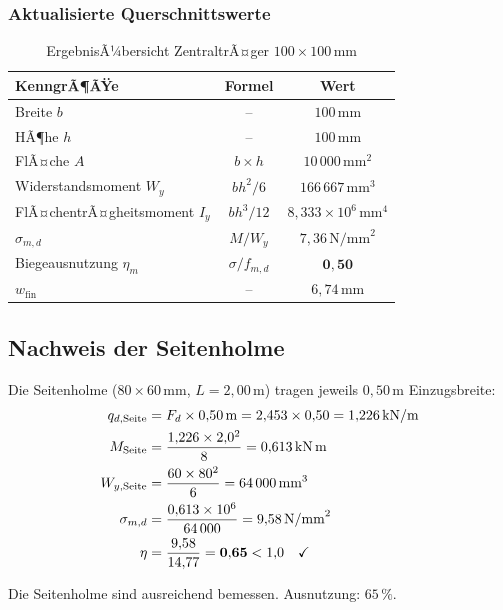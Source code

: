 ﻿\documentclass[12pt,a4paper]{article}
\theoremstyle{definition}
\theoremstyle{plain}
\theoremstyle{remark}
\begin{document}
\subsubsection{Aktualisierte Querschnittswerte}

\begin{table}[H]
\centering
\begin{tabular}{lcc}
\toprule
KenngrÃ¶ÃŸe & Formel & Wert \\
\midrule
Breite $b$ & -- & $100\,\text{mm}$ \\
HÃ¶he $h$   & -- & $100\,\text{mm}$ \\
FlÃ¤che $A$ & $b \times h$ & $10\,000\,\text{mm}^2$ \\
Widerstandsmoment $W_y$ & $b h^2 / 6$ & $166\,667\,\text{mm}^3$ \\
FlÃ¤chentrÃ¤gheitsmoment $I_y$ & $b h^3 / 12$ & $8{,}333 \times 10^6\,\text{mm}^4$ \\
\midrule
$\sigma_{m,d}$ & $M/W_y$ & $7{,}36\,\text{N/mm}^2$ \\
Biegeausnutzung $\eta_m$ & $\sigma/f_{m,d}$ & $\mathbf{0{,}50}$ \\
$w_{\text{fin}}$ & -- & $6{,}74\,\text{mm}$ \\
\bottomrule
\end{tabular}
\caption{ErgebnisÃ¼bersicht ZentraltrÃ¤ger $100\times100\,\text{mm}$}
\end{table}

\subsection{Nachweis der Seitenholme}

Die Seitenholme ($80 \times 60\,\text{mm}$, $L = 2{,}00\,\text{m}$) tragen
jeweils $0{,}50\,\text{m}$ Einzugsbreite:
\begin{align*}
  q_{d,\text{Seite}} &= F_d \times 0{,}50\,\text{m} = 2{,}453 \times 0{,}50 = 1{,}226\,\text{kN/m} \\
  M_{\text{Seite}}   &= \frac{1{,}226 \times 2{,}0^2}{8} = 0{,}613\,\text{kN\,m} \\
  W_{y,\text{Seite}} &= \frac{60 \times 80^2}{6} = 64\,000\,\text{mm}^3 \\
  \sigma_{m,d}       &= \frac{0{,}613 \times 10^6}{64\,000} = 9{,}58\,\text{N/mm}^2 \\
  \eta               &= \frac{9{,}58}{14{,}77} = \mathbf{0{,}65} < 1{,}0 \quad \checkmark
\end{align*}

Die Seitenholme sind ausreichend bemessen. Ausnutzung: $65\,\%$.
\end{document}
